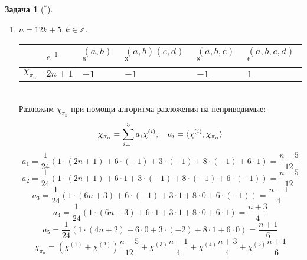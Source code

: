 \documentclass[12pt]{article}
\theoremstyle{definition}
\newtheorem{zad}{Задача}[section]
\begin{document}
\begin{zad}[$^*$]
\begin{itemize}
\begin{enumerate}
    \item $n=12k+5,k\in\mathbb{Z}$.
    \begin{table}[h!]
    \centering
    \begin{tabular}{|l|l|l|l|l|l|}
    \hline
     & $e$ $^1$ & $(a,b)$ $^6$ & $(a,b)(c,d)$ $^3$ & $(a,b,c)$ $^8$ & $(a,b,c,d)$ $^6$ \\ \hline
    $\chi_{\pi_n}$ & $2n+1$ & $-1$ & $-1$ & $-1$ & $1$ \\ \hline
    \end{tabular}
    \end{table}\\
    Разложим $\chi_{\pi_n}$ при помощи алгоритма разложения на неприводимые:
    \begin{equation}
        \chi_{\pi_n}=\sum\limits_{i=1}^5 a_i\chi^{(i)},\quad a_i=\braket{\chi^{(i)},\chi_{\pi_n}}
    \end{equation}
    \begin{equation}
        a_1=\frac{1}{24}(1\cdot(2n+1)+6\cdot(-1)+3\cdot(-1)+8\cdot(-1)+6\cdot1)=\frac{n-5}{12}
    \end{equation}
    \begin{equation}
        a_2=\frac{1}{24}(1\cdot(2n+1)+6\cdot1+3\cdot(-1)+8\cdot(-1)+6\cdot(-1))=\frac{n-5}{12}
    \end{equation}
    \begin{equation}
        a_3=\frac{1}{24}(1\cdot(6n+3)+6\cdot(-1)+3\cdot1+8\cdot0+6\cdot(-1))=\frac{n-1}{4}
    \end{equation}
    \begin{equation}
        a_4=\frac{1}{24}(1\cdot(6n+3)+6\cdot1+3\cdot1+8\cdot0+6\cdot1)=\frac{n+3}{4}
    \end{equation}
    \begin{equation}
        a_5=\frac{1}{24}(1\cdot(4n+2)+6\cdot0+3\cdot(-2)+8\cdot1+6\cdot0)=\frac{n+1}{6}
    \end{equation}
    \begin{equation}
        \boxed{\chi_{\pi_n}=(\chi^{(1)}+\chi^{(2)})\frac{n-5}{12}+\chi^{(3)}\frac{n-1}{4}+\chi^{(4)}\frac{n+3}{4}+\chi^{(5)}\frac{n+1}{6}}
    \end{equation}
    

\end{enumerate}
\end{itemize}
\end{zad}
\end{document}
